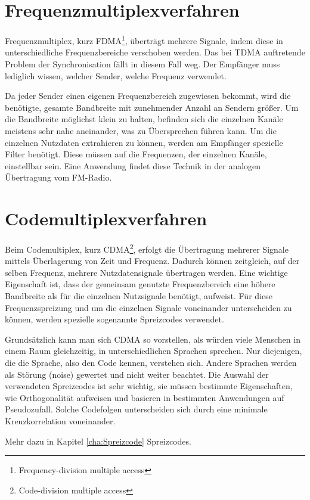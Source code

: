 \section{Frequenzmultiplexverfahren}
Frequenzmultiplex, kurz FDMA\footnote{Frequency-division multiple access}, überträgt mehrere Signale, indem diese in unterschiedliche Frequenzbereiche verschoben werden. Das bei TDMA auftretende Problem der Synchronisation fällt in diesem Fall weg. Der Empfänger muss lediglich wissen, welcher Sender, welche Frequenz verwendet.

Da jeder Sender einen eigenen Frequenzbereich zugewiesen bekommt, wird die benötigte, gesamte Bandbreite mit zunehmender Anzahl an Sendern größer.  Um die Bandbreite möglichst klein zu halten, befinden sich die einzelnen Kanäle meistens sehr nahe aneinander, was zu Übersprechen führen kann. Um die einzelnen Nutzdaten extrahieren zu können, werden am Empfänger spezielle Filter benötigt. Diese müssen auf die Frequenzen, der einzelnen Kanäle, einstellbar sein. Eine Anwendung findet diese Technik in der analogen Übertragung vom FM-Radio.

\section{Codemultiplexverfahren}
\label{sec:CDMA}
Beim Codemultiplex, kurz CDMA\footnote{Code-division multiple access}, erfolgt die Übertragung mehrerer Signale mittels Überlagerung von Zeit und Frequenz. Dadurch können zeitgleich, auf der selben Frequenz, mehrere Nutzdatensignale übertragen werden. Eine wichtige Eigenschaft ist, dass der gemeinsam genutzte Frequenzbereich eine höhere Bandbreite als für die einzelnen Nutzsignale benötigt, aufweist. Für diese Frequenzspreizung und um die einzelnen Signale voneinander unterscheiden zu können, werden spezielle sogenannte Spreizcodes verwendet.

Grundsätzlich kann man sich CDMA so vorstellen, als würden viele Menschen in einem Raum gleichzeitig, in unterschiedlichen Sprachen sprechen. Nur diejenigen, die die Sprache, also den Code kennen, verstehen sich. Andere Sprachen werden als Störung (noise) gewertet und nicht weiter beachtet. Die Auswahl der verwendeten Spreizcodes ist sehr wichtig, sie müssen bestimmte Eigenschaften, wie Orthogonalität aufweisen und basieren in bestimmten Anwendungen auf Pseudozufall. Solche Codefolgen unterscheiden sich durch eine minimale Kreuzkorrelation voneinander. 

Mehr dazu in Kapitel \ref{cha:Spreizcode} Spreizcodes.

